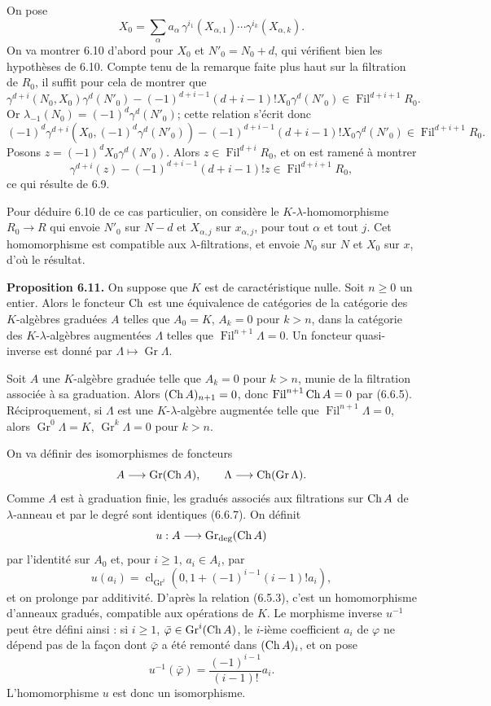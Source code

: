 \documentclass[11pt]{article}
\newcommand{\Gr}{\operatorname{Gr}}
\newcommand{\Fil}{\operatorname{Fil}}
\newcommand{\cl}{\operatorname{cl}}
\providecommand{\Gr}{\operatorname{Gr}}
\providecommand{\Gr}{\operatorname{G}}
\begin{document}
On pose
\[
  X_0=\sum_\alpha a_\alpha\,
       \gamma^{i_1}(X_{\alpha,1})\cdots
       \gamma^{i_k}(X_{\alpha,k}).
\]
On va montrer 6.10 d'abord pour \(X_0\) et \(N'_0=N_0+d\), qui vérifient bien les hypothèses de 6.10. Compte tenu de la remarque faite plus haut sur la filtration de \(R_0\), il suffit pour cela de montrer que
\[
  \gamma^{d+i}(N_0,X_0)\gamma^d(N'_0)
  -
  (-1)^{d+i-1}(d+i-1)!X_0\gamma^d(N'_0)
  \in\Fil^{d+i+1}R_0 .
\]
Or \(\lambda_{-1}(N_0)=(-1)^d\gamma^d(N'_0)\); cette relation s'écrit donc
\[
  (-1)^d\gamma^{d+i}(X_0,(-1)^d\gamma^d(N'_0))
  -
  (-1)^{d+i-1}(d+i-1)!X_0\gamma^d(N'_0)
  \in\Fil^{d+i+1}R_0 .
\]
Posons \(z=(-1)^dX_0\gamma^d(N'_0)\). Alors \(z\in\Fil^{d+i}R_0\), et on est ramené à montrer
\[
  \gamma^{d+i}(z)-(-1)^{d+i-1}(d+i-1)!z\in\Fil^{d+i+1}R_0,
\]
ce qui résulte de 6.9.

Pour déduire 6.10 de ce cas particulier, on considère le \(K\)-\(\lambda\)-homomorphisme \(R_0\to R\) qui envoie \(N'_0\) sur \(N-d\) et \(X_{\alpha,j}\) sur \(x_{\alpha,j}\), pour tout \(\alpha\) et tout \(j\). Cet homomorphisme est compatible aux \(\lambda\)-filtrations, et envoie \(N_0\) sur \(N\) et \(X_0\) sur \(x\), d'où le résultat.

\textbf{Proposition 6.11.} On suppose que \(K\) est de caractéristique nulle. Soit \(n\ge0\) un entier. Alors le foncteur \(\operatorname{Ch}\) est une équivalence de catégories de la catégorie des \(K\)-algèbres graduées \(A\) telles que \(A_0=K\), \(A_k=0\) pour \(k>n\), dans la catégorie des \(K\)-\(\lambda\)-algèbres augmentées \(\Lambda\) telles que \(\Fil^{n+1}\Lambda=0\). Un foncteur quasi-inverse est donné par \(\Lambda\mapsto\Gr\Lambda\).

Soit \(A\) une \(K\)-algèbre graduée telle que \(A_k=0\) pour \(k>n\), munie de la filtration associée à sa graduation. Alors \((\operatorname{Ch} A)_{n+1}=0\), donc \(\Fil^{n+1}\Ch A=0\) par (6.6.5). Réciproquement, si \(\Lambda\) est une \(K\)-\(\lambda\)-algèbre augmentée telle que \(\Fil^{n+1}\Lambda=0\), alors \(\Gr^0\Lambda=K\), \(\Gr^k\Lambda=0\) pour \(k>n\).

On va définir des isomorphismes de foncteurs
\[
  A\longrightarrow \Gr(\Ch A),
  \qquad
  \Lambda\longrightarrow \Ch(\Gr\Lambda).
\]
Comme \(A\) est à graduation finie, les gradués associés aux filtrations sur \(\operatorname{Ch} A\) de \(\lambda\)-anneau et par le degré sont identiques (6.6.7). On définit
\[
  u:A\longrightarrow \Gr_{\deg}(\Ch A)
\]
par l'identité sur \(A_0\) et, pour \(i\ge1\), \(a_i\in A_i\), par
\[
  u(a_i)=\cl_{\Gr^i}\left(0,1+(-1)^{i-1}(i-1)!a_i\right),
\]
et on prolonge par additivité. D'après la relation (6.5.3), c'est un homomorphisme d'anneaux gradués, compatible aux opérations de \(K\). Le morphisme inverse \(u^{-1}\) peut être défini ainsi : si \(i\ge1\), \(\bar\varphi\in\Gr^i(\Ch A)\), le \(i\)-ième coefficient \(a_i\) de \(\varphi\) ne dépend pas de la façon dont \(\bar\varphi\) a été remonté dans \((\operatorname{Ch} A)_i\), et on pose
\[
  u^{-1}(\bar\varphi)=\frac{(-1)^{i-1}}{(i-1)!}a_i.
\]
L'homomorphisme \(u\) est donc un isomorphisme.
\end{document}

